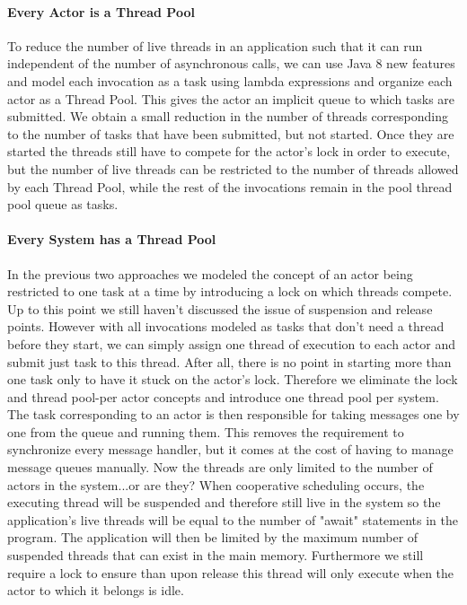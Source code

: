 \paragraph{Every Actor is a Thread Pool}
To reduce the number of live threads in an application such that it can run independent of the number of asynchronous calls, we can use Java 8 new features and model each invocation as a task using lambda expressions and organize each actor as a Thread Pool. This gives the actor an implicit queue to which tasks are submitted. We obtain a small reduction in the number of threads corresponding to the number of tasks that have been submitted, but not started.  Once they are started the threads still have to compete for the actor's lock in order to execute, but the number of live threads can be restricted to the number of threads allowed by each Thread Pool, while the rest of the invocations remain in the pool thread pool queue as tasks. 

\paragraph{Every System has a Thread Pool}
In the previous two approaches we modeled the concept of an actor being restricted to one task at a time by introducing a lock on which threads compete. Up to this point we still haven't discussed the issue of suspension and release points. However with all invocations modeled as tasks that don't need a thread before they start, we can simply assign one thread of execution to each actor and submit just task to this thread. After all, there is no point in starting more than one task only to have it stuck on the actor's lock. Therefore we eliminate the lock and thread pool-per actor concepts and introduce one thread pool per system. The task corresponding to an actor is then responsible for taking messages one by one from the queue and running them. This removes the requirement to synchronize every message handler, but it comes at the cost of having to manage message queues manually.
Now the threads are only limited to the number of actors in the system...or are they? When cooperative scheduling occurs, the executing thread will be suspended and therefore still live in the system so the application's live threads will be equal to the number of "await" statements in the program. The application will then be limited by the maximum number of suspended threads that can exist in the main memory.  Furthermore we still require a lock to ensure than upon release this thread will only execute when the actor to which it belongs is idle.

